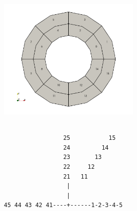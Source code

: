 \begin{center}
\includegraphics[width=7cm]{images/ELEFANT/annulus_Q2}
\end{center}

\begin{verbatim}

                 25           15
                 24         14
                 23       13
                 22     12
                 21   11
                  |     
                  |
45 44 43 42 41----+------1-2-3-4-5
\end{verbatim}




